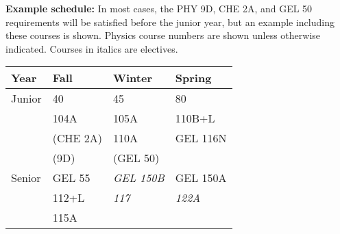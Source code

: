 \documentclass[12pt]{article}
\begin{document}
\noindent
{\bf Example schedule:} In most cases, the PHY 9D, CHE 2A, and GEL 50
requirements will be satisfied before the junior year, but an example
including these courses is shown.  Physics course numbers are shown
unless otherwise indicated.  Courses in italics are electives.\\
\vskip 0.25cm
\begin{center}
\begin{tabular}{|l|l|l|l|}
\hline
Year      & Fall    & Winter & Spring \\
\hline
Junior    & 40         & 45           & 80 \\
          & 104A       & 105A         & 110B+L \\
          & (CHE 2A)   & 110A         & GEL 116N \\
          & (9D)       & (GEL 50)     &  \\
\hline
Senior   & GEL 55      & {\it GEL 150B}     & GEL 150A \\
         & 112+L       & {\it 117}         & {\it 122A}  \\
         & 115A        &              & \\
\hline
\end{tabular}
\newpage



\end{center}
\end{document}
